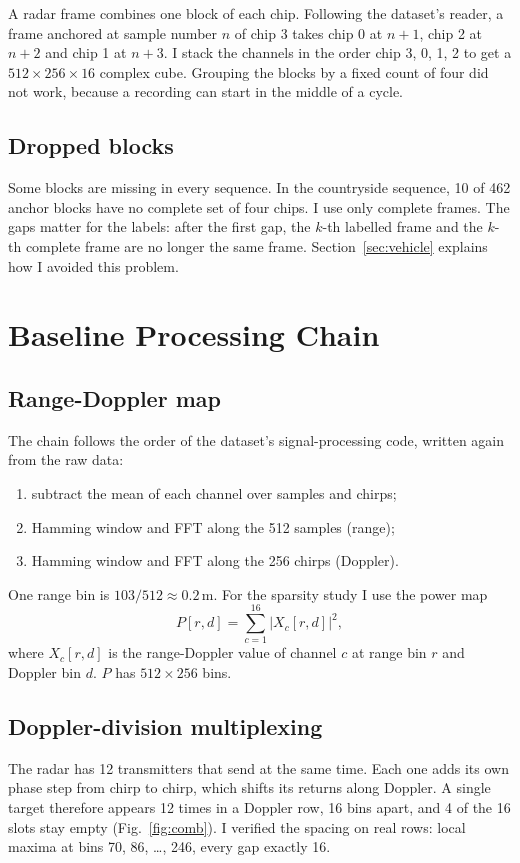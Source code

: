 \documentclass[10pt,a4paper]{article}
\begin{document}
A radar frame combines one block of each chip. Following the dataset's reader, a frame anchored at sample number $n$ of chip 3 takes chip 0 at $n+1$, chip 2 at $n+2$ and chip 1 at $n+3$. I stack the channels in the order chip 3, 0, 1, 2 to get a $512 \times 256 \times 16$ complex cube. Grouping the blocks by a fixed count of four did not work, because a recording can start in the middle of a cycle.

\subsection{Dropped blocks}
Some blocks are missing in every sequence. In the countryside sequence, 10 of 462 anchor blocks have no complete set of four chips. I use only complete frames. The gaps matter for the labels: after the first gap, the $k$-th labelled frame and the $k$-th complete frame are no longer the same frame. Section~\ref{sec:vehicle} explains how I avoided this problem.

\section{Baseline Processing Chain}
\subsection{Range-Doppler map}
The chain follows the order of the dataset's signal-processing code, written again from the raw data:
\begin{enumerate}
\item subtract the mean of each channel over samples and chirps;
\item Hamming window and FFT along the 512 samples (range);
\item Hamming window and FFT along the 256 chirps (Doppler).
\end{enumerate}
One range bin is $103/512 \approx 0.2$\,m. For the sparsity study I use the power map
\begin{equation}
P[r, d] = \sum_{c=1}^{16} \left| X_c[r, d] \right|^2 ,
\label{eq:power}
\end{equation}
where $X_c[r,d]$ is the range-Doppler value of channel $c$ at range bin $r$ and Doppler bin $d$. $P$ has $512 \times 256$ bins.

\subsection{Doppler-division multiplexing}
The radar has 12 transmitters that send at the same time. Each one adds its own phase step from chirp to chirp, which shifts its returns along Doppler. A single target therefore appears 12 times in a Doppler row, 16 bins apart, and 4 of the 16 slots stay empty (Fig.~\ref{fig:comb}). I verified the spacing on real rows: local maxima at bins 70, 86, \ldots, 246, every gap exactly 16.
\end{document}
